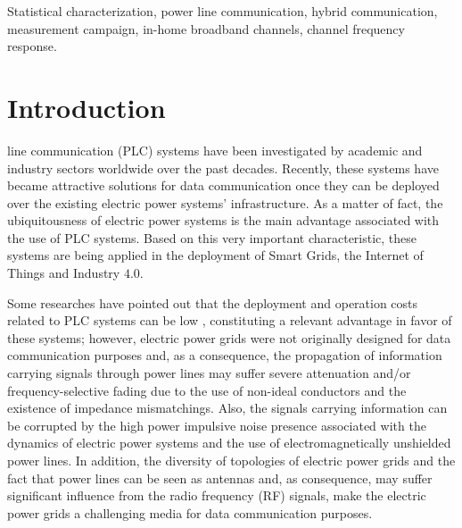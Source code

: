 \documentclass[journal]{IEEEtran}
\begin{document}
\begin{IEEEkeywords}
Statistical characterization, power line communication, hybrid communication, measurement campaign, in-home broadband channels, channel frequency response.
\end{IEEEkeywords}

\IEEEpeerreviewmaketitle

\section{Introduction}

 line communication (PLC) systems have been investigated by academic and industry sectors worldwide over the past decades. Recently, these systems have became attractive solutions for data communication once they can be deployed over the existing electric power systems' infrastructure. As a matter of fact, the ubiquitousness of electric power systems is the main advantage associated with the use of \ac{PLC} systems. Based on this very important characteristic, these systems are being applied in the deployment of Smart Grids, the Internet of Things and Industry $4.0$. 

Some researches have pointed out that the deployment and operation costs related to \ac{PLC} systems can be low \cite{Hrasnica:PLC_design, Dib}, constituting a relevant advantage in favor of these systems; however, electric power grids were not originally designed for data communication purposes and, as a consequence, the propagation of information carrying signals through power lines may suffer severe attenuation and/or frequency-selective fading due to the use of non-ideal conductors and the existence of impedance mismatchings. Also, the signals carrying information can be corrupted by the high power impulsive noise presence associated with the dynamics of electric power systems and the use of electromagnetically unshielded power lines. In addition, the diversity of topologies of electric power grids and the fact that power lines can be seen as antennas and, as consequence, may suffer significant influence from the radio frequency (RF) signals, make the electric power grids a challenging media for data communication purposes.  
\end{document}
